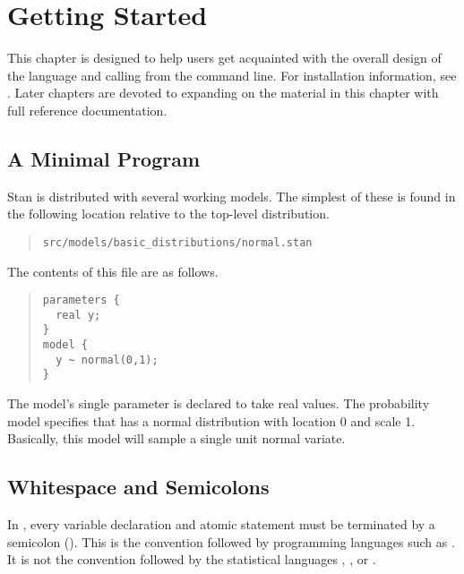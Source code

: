 \chapter{Getting Started}

This chapter is designed to help users get acquainted with the overall
design of the \Stan language and calling \Stan from the command line.
For installation information, see .
Later chapters are devoted to expanding on the material in this
chapter with full reference documentation.


\section{A Minimal Program}

Stan is distributed with several working models.  The simplest of
these is found in the following location relative to the top-level
distribution.
%
\begin{quote}
\begin{Verbatim}
src/models/basic_distributions/normal.stan
\end{Verbatim}
\end{quote}
%
The contents of this file are as follows.
%
\begin{quote}
\begin{Verbatim}
parameters {
  real y;
}
model {
  y ~ normal(0,1);
}
\end{Verbatim}
\end{quote}
%
The model's single parameter  is declared to take real values.
The probability model specifies that  has a normal
distribution with location 0 and scale 1.  Basically, this model will
sample a single unit normal variate.  

\section{Whitespace and Semicolons}

In \Stan, every variable declaration and atomic statement must be
terminated by a semicolon (\code{;}).  This is the convention followed
by programming languages such as \Cpp.  It is not the convention
followed by the statistical languages \R, \BUGS, or \JAGS.


